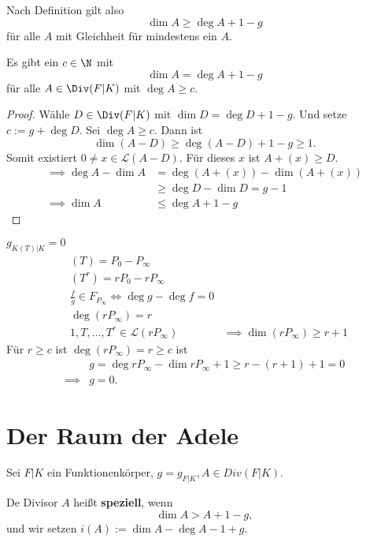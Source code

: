 \begin{bemerkungnr}
    Nach Definition gilt also 
    $$ \dim A \geq \deg A + 1 -g $$
    für alle $A$ mit Gleichheit für mindestens ein $A$.
\end{bemerkungnr}

\begin{theorem}[Riemann]
    Es gibt ein $c \in \N$ mit $$ \dim A = \deg A +1 -g$$
    für alle $A \in \Div(F|K)$ mit $\deg A \geq c$.
\end{theorem}
\begin{proof}
    Wähle $D \in \Div(F|K)$ mit $\dim D = \deg D + 1 - g$.
    Und setze $c := g + \deg D$. Sei $\deg A \geq c$.
    Dann ist 
    $$\dim (A-D) \geq \deg(A-D) + 1 -g \geq 1.$$
    Somit existiert $0 \ne x \in \mathcal{L}(A-D)$. 
    Für dieses $x$ ist $A + (x) \geq D$.
    \begin{align*}
        \implies \deg A - \dim A &= \deg (A + (x)) - \dim (A + (x))\\
        & \geq \deg D - \dim D = g - 1\\
        \implies \dim A &\leq \deg A + 1 - g
    \end{align*} 
\end{proof}

\begin{beispiel}
    $g_{K(T)|K} = 0$
    \begin{align*}
        &(T) = P_0 - P_\infty\\
        &(T^r) = r P_0 - r P_\infty\\
        &\frac{f}{g} \in F_{P_\infty} \iff \deg g - \deg f = 0\\
        &\deg(rP_\infty) = r\\
        &1,T,\ldots,T^r \in \mathcal{L}(rP_\infty) &\implies \dim(rP_\infty) \geq r +1
    \end{align*}
    Für $r \geq c$ ist $\deg(rP_\infty) = r \geq c$ ist
    \begin{align*}
        & g = \deg rP_\infty - \dim rP_\infty + 1 \geq r - (r+1) + 1 = 0\\
        \implies & g=0.
    \end{align*}
\end{beispiel}

\section{Der Raum der Adele}
Sei $F|K$ ein Funktionenkörper, $g = g_{F|K}, A \in Div(F|K)$.

\begin{definition}
    De Divisor $A$ heißt \textbf{speziell}, wenn 
    $$ \dim A > A + 1 - g,$$
    und wir setzen $i(A) := \dim A - \deg A - 1 +g$.
\end{definition}

